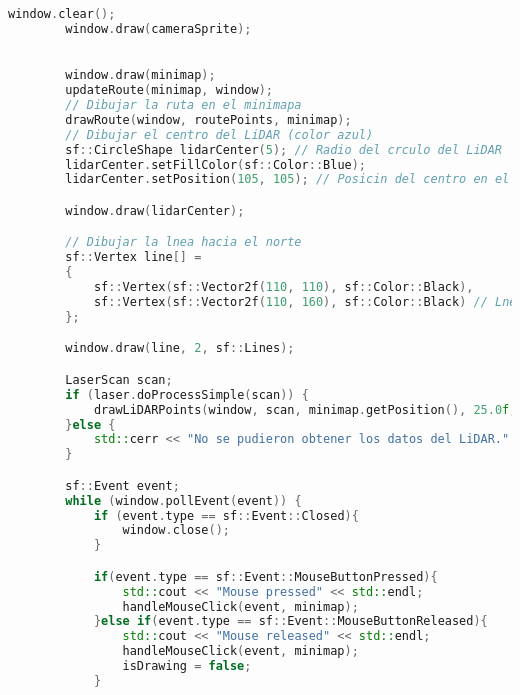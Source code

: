 \begin{lstlisting}[language={C++}, caption={Cuarto ajuste de c\'odigo}, label={CuartoAjuste}]
        window.clear();
        window.draw(cameraSprite);

        
        window.draw(minimap);
        updateRoute(minimap, window);
        // Dibujar la ruta en el minimapa
        drawRoute(window, routePoints, minimap);
        // Dibujar el centro del LiDAR (color azul)
        sf::CircleShape lidarCenter(5); // Radio del crculo del LiDAR
        lidarCenter.setFillColor(sf::Color::Blue);
        lidarCenter.setPosition(105, 105); // Posicin del centro en el minimapa

        window.draw(lidarCenter);

        // Dibujar la lnea hacia el norte
        sf::Vertex line[] =
        {
            sf::Vertex(sf::Vector2f(110, 110), sf::Color::Black),
            sf::Vertex(sf::Vector2f(110, 160), sf::Color::Black) // Lnea hacia arriba (norte)
        };

        window.draw(line, 2, sf::Lines);

        LaserScan scan;
        if (laser.doProcessSimple(scan)) {
            drawLiDARPoints(window, scan, minimap.getPosition(), 25.0f, max_range);
        }else {
            std::cerr << "No se pudieron obtener los datos del LiDAR." << std::endl;
        }

        sf::Event event;
        while (window.pollEvent(event)) {
            if (event.type == sf::Event::Closed){
                window.close();
            }

            if(event.type == sf::Event::MouseButtonPressed){
                std::cout << "Mouse pressed" << std::endl;
                handleMouseClick(event, minimap);
            }else if(event.type == sf::Event::MouseButtonReleased){
                std::cout << "Mouse released" << std::endl;
                handleMouseClick(event, minimap);
                isDrawing = false;
            }
            




\end{lstlisting}
